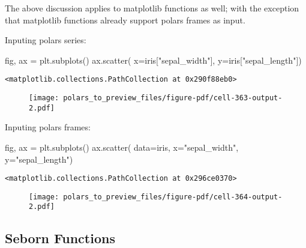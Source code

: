 \documentclass[
  letterpaper,
  DIV=11,
  numbers=noendperiod]{scrartcl}
\newenvironment{Shaded}{\begin{snugshade}}{\end{snugshade}}
\newcommand{\NormalTok}[1]{\textcolor[rgb]{0.00,0.23,0.31}{#1}}
\newcommand{\OperatorTok}[1]{\textcolor[rgb]{0.37,0.37,0.37}{#1}}
\newcommand{\StringTok}[1]{\textcolor[rgb]{0.13,0.47,0.30}{#1}}
\begin{document}
The above discussion applies to matplotlib functions as well; with the
exception that matplotlib functions already support polars frames as
input.

Inputing polars series:

\begin{Shaded}
\begin{Highlighting}[]
\NormalTok{fig, ax }\OperatorTok{=}\NormalTok{ plt.subplots()}
\NormalTok{ax.scatter(}
\NormalTok{    x}\OperatorTok{=}\NormalTok{iris[}\StringTok{"sepal\_width"}\NormalTok{], }
\NormalTok{    y}\OperatorTok{=}\NormalTok{iris[}\StringTok{"sepal\_length"}\NormalTok{])}
\end{Highlighting}
\end{Shaded}

\begin{verbatim}
<matplotlib.collections.PathCollection at 0x290f88eb0>
\end{verbatim}

\begin{figure}[H]

{\centering \texttt{[image: polars\_to\_preview\_files/figure-pdf/cell-363-output-2.pdf]}

}

\end{figure}

Inputing polars frames:

\begin{Shaded}
\begin{Highlighting}[]
\NormalTok{fig, ax }\OperatorTok{=}\NormalTok{ plt.subplots()}
\NormalTok{ax.scatter(}
\NormalTok{    data}\OperatorTok{=}\NormalTok{iris,}
\NormalTok{    x}\OperatorTok{=}\StringTok{"sepal\_width"}\NormalTok{,}
\NormalTok{    y}\OperatorTok{=}\StringTok{"sepal\_length"}\NormalTok{)}
\end{Highlighting}
\end{Shaded}

\begin{verbatim}
<matplotlib.collections.PathCollection at 0x296ce0370>
\end{verbatim}

\begin{figure}[H]

{\centering \texttt{[image: polars\_to\_preview\_files/figure-pdf/cell-364-output-2.pdf]}

}

\end{figure}

\hypertarget{seborn-functions}{%
\subsection{Seborn Functions}\label{seborn-functions}}
\end{document}
